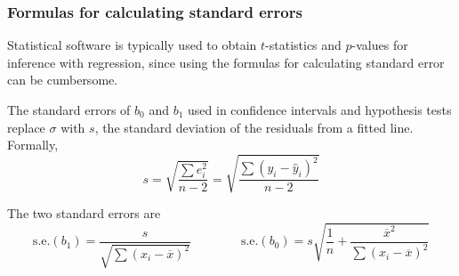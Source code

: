 \subsubsection{Formulas for calculating standard errors}

Statistical software is typically used to obtain $t$-statistics and $p$-values for inference with regression, since using the formulas for calculating standard error can be cumbersome.

The standard errors of $b_0$ and $b_1$ used in confidence intervals and hypothesis tests replace $\sigma$ with $s$, the standard deviation of the residuals from a fitted line. Formally, 
\[s = \sqrt{\frac{\sum e^{2}_{i}}{n-2}} =  \sqrt{\frac{\sum (y_{i}-\hat{y}_{i})^{2}}{n-2}} \]

The two standard errors are
\[\text{s.e.}(b_1) = \frac{s}{\sqrt{\sum(x_i -\overline{x})^2}}  \qquad \qquad \text{s.e.}(b_0) = s \sqrt{\frac{1}{n} + \frac{\overline{x}^2}
	{\sum(x_i - \overline{x})^2}} \]


